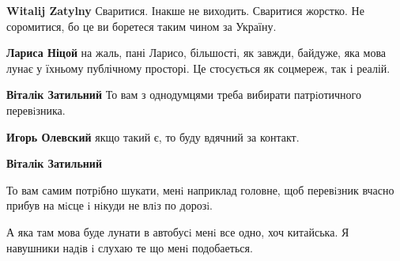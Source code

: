 \begin{itemize}
\begin{itemize}
\textbf{Witalij Zatylny} Сваритися. Інакше не виходить. Сваритися жорстко. Не
соромитися, бо це ви боретеся таким чином за Україну.

\begin{itemize}
 
\textbf{Лариса Ніцой} на жаль, пані Ларисо, більшості, як завжди, байдуже, яка
мова лунає у їхньому публічному просторі. Це стосується як соцмереж, так і
реалій.
\end{itemize}

 
\textbf{Віталік Затильний}
То вам з однодумцями треба вибирати патрiотичного перевiзника.

\begin{itemize}
 
\textbf{Игорь Олевский} якщо такий є, то буду вдячний за контакт.

 
\textbf{Віталік Затильний}

То вам самим потрiбно шукати, менi наприклад головне, щоб перевiзник вчасно
прибув на мiсце i нiкуди не влiз по дорозi.

А яка там мова буде лунати в автобусi менi все одно, хоч китайська. Я навушники
надiв i слухаю те що менi подобаеться.


 

\end{itemize}
\end{itemize}
\end{itemize}
